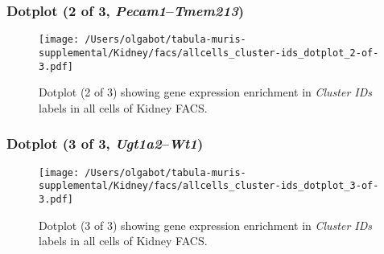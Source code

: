 \clearpage

\subsubsection{Dotplot (2 of 3, \emph{Pecam1}--\emph{Tmem213})}
\begin{figure}[h]
\centering
\texttt{[image: /Users/olgabot/tabula-muris-supplemental/Kidney/facs/allcells\_cluster-ids\_dotplot\_2-of-3.pdf]}

\caption{ Dotplot (2 of 3)  showing gene expression enrichment in \emph{Cluster IDs} labels in all cells of Kidney FACS. }
\end{figure}


\clearpage

\subsubsection{Dotplot (3 of 3, \emph{Ugt1a2}--\emph{Wt1})}
\begin{figure}[h]
\centering
\texttt{[image: /Users/olgabot/tabula-muris-supplemental/Kidney/facs/allcells\_cluster-ids\_dotplot\_3-of-3.pdf]}

\caption{ Dotplot (3 of 3)  showing gene expression enrichment in \emph{Cluster IDs} labels in all cells of Kidney FACS. }
\end{figure}

